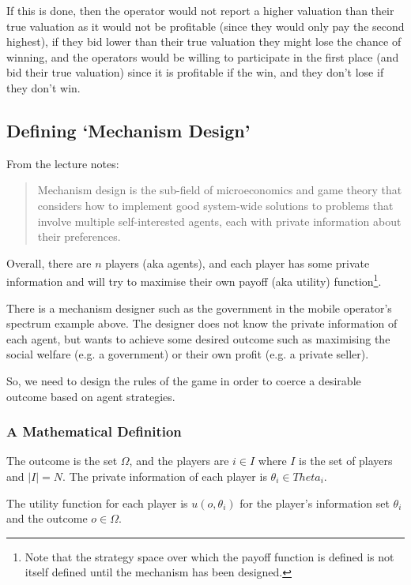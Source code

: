 If this is done, then the operator would not report a higher valuation
than their true valuation as it would not be profitable (since they
would only pay the second highest), if they bid lower than their true
valuation they might lose the chance of winning, and the operators
would be willing to participate in the first place (and bid their true
valuation) since it is profitable if the win, and they don't lose if
they don't win.


\subsection{Defining `Mechanism Design'}

From the lecture notes:

\begin{quote}
  Mechanism design is the sub-field of microeconomics and game theory
  that considers how to implement good system-wide solutions to
  problems that involve multiple self-interested agents, each with
  private information about their preferences.
\end{quote}

Overall, there are $n$ players (aka agents), and each player has some
private information and will try to maximise their own payoff (aka
utility) function\footnote{Note that the strategy space over which the
payoff function is defined is not itself defined until the mechanism
has been designed.}.

There is a mechanism designer such as the government in the mobile
operator's spectrum example above. The designer does not know the
private information of each agent, but wants to achieve some desired
outcome such as maximising the social welfare (e.g. a government) or
their own profit (e.g. a private seller).

So, we need to design the rules of the game in order to coerce a
desirable outcome based on agent strategies.

\subsubsection{A Mathematical Definition}

The outcome is the set $\Omega$, and the players are $i \in I$ where
$I$ is the set of players and $|I| = N$. The private information of
each player is $\theta_i \in Theta_i$.

The utility function for each player is $u(o,\theta_i)$ for the
player's information set $\theta_i$ and the outcome $o \in \Omega$.

